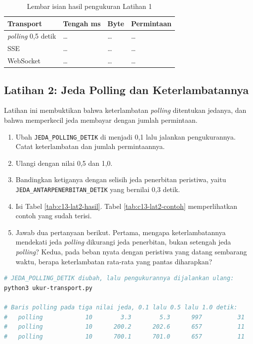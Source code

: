 \begin{table}[!htb]
  \centering
  \caption{Lembar isian hasil pengukuran Latihan 1}
  \label{tab:c13-lat1-hasil}
  \begin{tabularx}{\textwidth}{Xlll}
    \hline
    \textbf{Transport} & \textbf{Tengah ms} & \textbf{Byte} & \textbf{Permintaan} \\
    \hline
    \textit{polling} 0,5 detik & \dots & \dots & \dots \\
    \hline
    SSE & \dots & \dots & \dots \\
    \hline
    WebSocket & \dots & \dots & \dots \\
    \hline
  \end{tabularx}
\end{table}

\subsection*{Latihan 2: Jeda Polling dan Keterlambatannya}

Latihan ini membuktikan bahwa keterlambatan \textit{polling} ditentukan
jedanya, dan bahwa memperkecil jeda membayar dengan jumlah permintaan.

\begin{enumerate}
  \item Ubah \texttt{JEDA\_POLLING\_DETIK} di 
        menjadi 0,1 lalu jalankan pengukurannya. Catat keterlambatan dan
        jumlah permintaannya.
  \item Ulangi dengan nilai 0,5 dan 1,0.
  \item Bandingkan ketiganya dengan selisih jeda penerbitan peristiwa, yaitu
        \texttt{JEDA\_ANTARPENERBITAN\_DETIK} yang bernilai 0,3 detik.
  \item Isi Tabel \ref{tab:c13-lat2-hasil}. Tabel \ref{tab:c13-lat2-contoh}
        memperlihatkan contoh yang sudah terisi.
  \item Jawab dua pertanyaan berikut. Pertama, mengapa keterlambatannya
        mendekati jeda \textit{polling} dikurangi jeda penerbitan, bukan
        setengah jeda \textit{polling}? Kedua, pada beban nyata dengan
        peristiwa yang datang sembarang waktu, berapa keterlambatan rata-rata
        yang pantas diharapkan?
\end{enumerate}

\begin{lstlisting}[language=bash, caption={Mengukur satu transport pada beberapa jeda, memakai \berkas{sources/chapter13/ukur-transport.py}}, label={lst:c13-lat2-jalan}]
# JEDA_POLLING_DETIK diubah, lalu pengukurannya dijalankan ulang:
python3 ukur-transport.py

# Baris polling pada tiga nilai jeda, 0.1 lalu 0.5 lalu 1.0 detik:
#   polling            10        3.3        5.3      997          31
#   polling            10      200.2      202.6      657          11
#   polling            10      700.1      701.0      657          11
\end{lstlisting}

